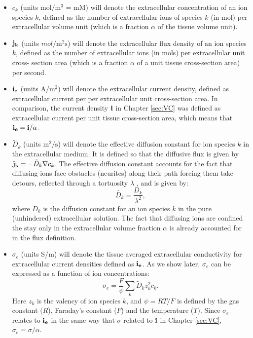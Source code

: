 \begin{itemize}
\item $c_k$ (units $\mathrm{mol/m^3}$ = mM) will denote the extracellular concentration of an ion species $k$, defined as the number of extracellular ions of species $k$ (in mol) per extracellular volume unit (which is a fraction $\alpha$ of the tissue volume unit).

\item ${\bf j_k}$ (units $mol/\mathrm{m^2s}$) will denote the extracellular flux density of an ion species $k$, defined as the number of extracellular ions (in mols) per extracellular unit cross- section area (which is a fraction $\alpha$ of a unit tissue cross-section area) per second.

\item  ${\bf i_e}$ (units $\mathrm{A/m^2}$) will denote the extracellular current density, defined as extracellular current per per extracellular unit cross-section area. In comparison, the current density ${\bf i}$ in Chapter \ref{sec:VC} was defined as extracellular current per unit tissue cross-section area, which means that ${\bf i_e} = {\bf i}/\alpha$.

\item $\tilde{D}_k$ (units $\mathrm{m^2/s}$) will denote the effective diffusion constant  for ion species $k$ in the extracellular medium. It is defined so that the diffusive flux is given by ${\bf j_k} = -\tilde{D}_k \nabla c_k$. The effective diffusion constant accounts for the fact that diffusing ions face obstacles (neurites) along their path forcing them take detours, reflected through a tortuosity $\lambda$ \citep{Nicholson1998}, and is given by:
\begin{equation}
\tilde{D_k} = \frac{D_k}{\lambda^2}, 
\label{Eldiff:eq:diffconst}
\end{equation}
where $D_k$ is the diffusion constant for an ion species $k$ in the pure (unhindered) extracellular solution. The fact that diffusing ions are confined the stay only in the extracellular volume fraction $\alpha$ is already accounted for in the flux definition.

\item $\sigma_e$ (units S/m) will denote the tissue averaged extracellular conductivity for extracellular current densities defined as ${\bf i_e}$. As we show later, $\sigma_e$ can be expressed as a function of ion concentrations:
\begin{equation}
\sigma_e = \frac{F}{\psi}\sum_{k} \tilde{D}_k z_{k}^2 c_{k}.
\label{Eldiff:eq:sigma1}
\end{equation}
Here $z_{k}$ is the valency of ion species $k$, and $\psi=RT/F$ is defined by the gas constant ($R$), Faraday's constant ($F$) and the temperature ($T$). Since $\sigma_e$ relates to ${\bf i_e}$ in the same way that $\sigma$ related to ${\bf i}$ in Chapter \ref{sec:VC}, $\sigma_e = \sigma /\alpha$.


\end{itemize}
